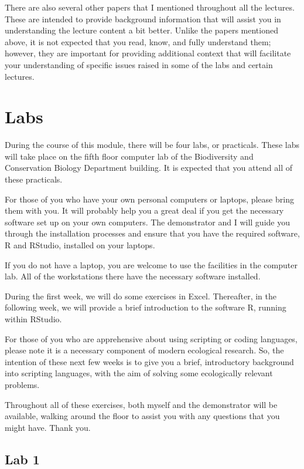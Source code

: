 \documentclass[
  12pt,
]{book}
\begin{document}
There are also several other papers that I mentioned throughout all the
lectures. These are intended to provide background information that will
assist you in understanding the lecture content a bit better. Unlike the
papers mentioned above, it is not expected that you read, know, and
fully understand them; however, they are important for providing
additional context that will facilitate your understanding of specific
issues raised in some of the labs and certain lectures.

\section{Labs}\label{labs}

During the course of this module, there will be four labs, or
practicals. These labs will take place on the fifth floor computer lab
of the Biodiversity and Conservation Biology Department building. It is
expected that you attend all of these practicals.

For those of you who have your own personal computers or laptops, please
bring them with you. It will probably help you a great deal if you get
the necessary software set up on your own computers. The demonstrator
and I will guide you through the installation processes and ensure that
you have the required software, R and RStudio, installed on your
laptops.

If you do not have a laptop, you are welcome to use the facilities in
the computer lab. All of the workstations there have the necessary
software installed.

During the first week, we will do some exercises in Excel. Thereafter,
in the following week, we will provide a brief introduction to the
software R, running within RStudio.

For those of you who are apprehensive about using scripting or coding
languages, please note it is a necessary component of modern ecological
research. So, the intention of these next few weeks is to give you a
brief, introductory background into scripting languages, with the aim of
solving some ecologically relevant problems.

Throughout all of these exercises, both myself and the demonstrator will
be available, walking around the floor to assist you with any questions
that you might have. Thank you.

\subsection{Lab 1}\label{lab-1}
\end{document}
